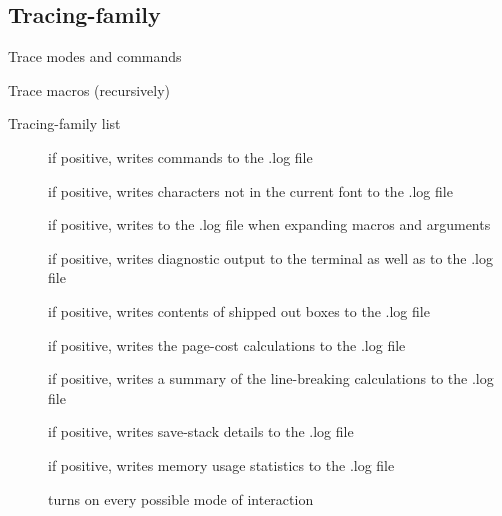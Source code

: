 \subsection{Tracing-family}

\begin{frame}[fragile]{Trace modes and commands\tW\magicPage}\relax
    
\end{frame}

\begin{frame}[fragile]{Trace macros (recursively)\tW\magicPage}\relax
    
\end{frame}


\begin{frame}{Tracing-family list}\relax
    \footnotesize
    
    \begin{description}
        \item[\ccol\tracingcommands] if positive, writes commands to the .log file
        \item[\ccol\tracinglostchars] if positive, writes characters not in the current font to the .log file
        \item[\ccol\tracingmacros] if positive, writes to the .log file when expanding macros and arguments
        \item[\ccol\tracingonline] if positive, writes diagnostic output to the terminal as well as to the .log file
        \item[\ccol\tracingoutput] if positive, writes contents of shipped out boxes to the .log file
        \item[\ccol\tracingpages] if positive, writes the page-cost calculations to the .log file
        \item[\ccol\tracingparagraphs] if positive, writes a summary of the line-breaking calculations to the .log file
        \item[\ccol\tracingrestores] if positive, writes save-stack details to the .log file
        \item[\ccol\tracingstats] if positive, writes memory usage statistics to the .log file
        \item[\ccol\tracingall] turns on every possible mode of interaction
    \end{description}
\end{frame}

